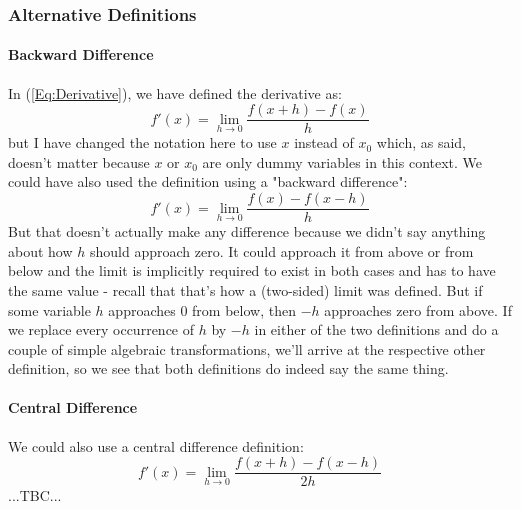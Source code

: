 \subsubsection{Alternative Definitions}

\paragraph{Backward Difference}
In (\ref{Eq:Derivative}), we have defined the derivative as:
\begin{equation}
 f'(x) = \lim_{h \rightarrow 0} \frac{f(x + h) - f(x)}{h}
\end{equation}
but I have changed the notation here to use $x$ instead of $x_0$ which, as said, doesn't matter because $x$ or $x_0$ are only dummy variables in this context. We could have also used the definition using a "backward difference":
\begin{equation}
 f'(x) = \lim_{h \rightarrow 0} \frac{f(x) - f(x-h)}{h}
\end{equation}
But that doesn't actually make any difference because we didn't say anything about how $h$ should approach zero. It could approach it from above or from below and the limit is implicitly required to exist in both cases and has to have the same value - recall that that's how a (two-sided) limit was defined. But if some variable $h$ approaches $0$ from below, then $-h$ approaches zero from above. If we replace every occurrence of $h$ by $-h$ in either of the two definitions and do a couple of simple algebraic transformations, we'll arrive at the respective other definition, so we see that both definitions do indeed say the same thing.


\paragraph{Central Difference} 
We could also use a central difference definition:
\begin{equation}
 f'(x) = \lim_{h \rightarrow 0} \frac{f(x+h) - f(x-h)}{2 h}
\end{equation}
...TBC...


